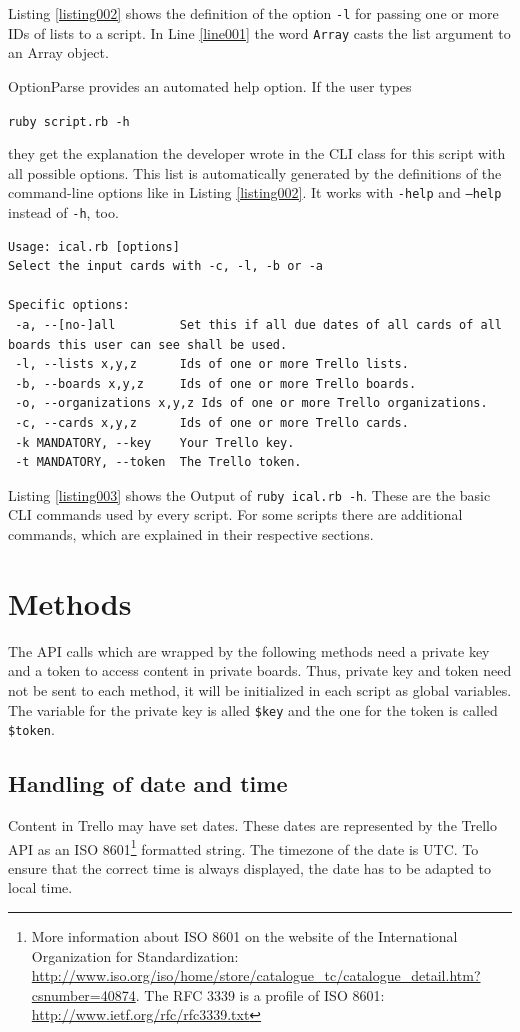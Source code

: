 Listing \ref{listing002} shows the definition of the option \texttt{-l} for passing one or more IDs of lists to a script. In Line \ref{line001} the word \lstinline{Array} casts the list argument to an Array object.

OptionParse provides an automated help option. If the user types 
\begin{center}
\texttt{ruby script.rb -h} 
\end{center}
they get the explanation the developer wrote in the CLI class for this script with all possible options. This list is automatically generated by the definitions of the command-line options like in Listing \ref{listing002}. It works with \texttt{-help} and \texttt{--help} instead of \texttt{-h}, too.

\begin{lstlisting}[aboveskip=1\baselineskip, style=bash, caption=Output of the \texttt{-h} option., label=listing003]
Usage: ical.rb [options]
Select the input cards with -c, -l, -b or -a

Specific options:
 -a, --[no-]all         Set this if all due dates of all cards of all boards this user can see shall be used.
 -l, --lists x,y,z      Ids of one or more Trello lists.
 -b, --boards x,y,z     Ids of one or more Trello boards.
 -o, --organizations x,y,z Ids of one or more Trello organizations.
 -c, --cards x,y,z      Ids of one or more Trello cards.
 -k MANDATORY, --key    Your Trello key.
 -t MANDATORY, --token  The Trello token.
\end{lstlisting}

Listing \ref{listing003} shows the Output of \texttt{ruby ical.rb -h}. 
These are the basic CLI commands used by every script. For some scripts there are additional commands, which are explained in their respective sections.

\section{Methods}
The API calls which are wrapped by the following methods need a private key and a token to access content in private boards. Thus, private key and token need not be sent to each method, it will be initialized in each script as global variables. The variable for the private key is alled \lstinline{$key} and the one for the token is called \lstinline{$token}.

\subsection{Handling of date and time}
Content in Trello may have set dates. These dates are represented by the Trello API as an ISO 8601\footnote{More information about ISO 8601 on the website of the International Organization for Standardization: \url{http://www.iso.org/iso/home/store/catalogue_tc/catalogue_detail.htm?csnumber=40874}. The RFC 3339 is a profile of ISO 8601: \url{http://www.ietf.org/rfc/rfc3339.txt}} formatted string. The timezone of the date is UTC. To ensure that the correct time is always displayed, the date has to be adapted to local time. 

